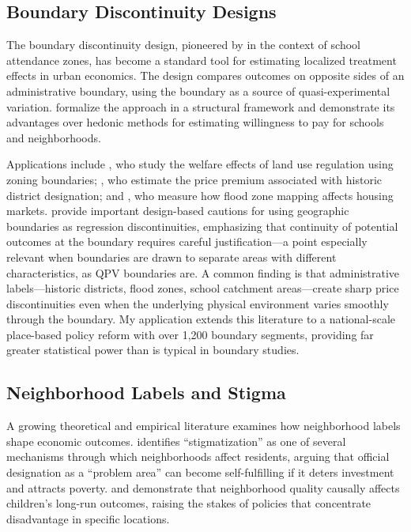 \documentclass[12pt]{article}
\begin{document}
\subsection{Boundary Discontinuity Designs}

The boundary discontinuity design, pioneered by \citet{black1999better} in the context of school attendance zones, has become a standard tool for estimating localized treatment effects in urban economics. The design compares outcomes on opposite sides of an administrative boundary, using the boundary as a source of quasi-experimental variation. \citet{bayer2007unified} formalize the approach in a structural framework and demonstrate its advantages over hedonic methods for estimating willingness to pay for schools and neighborhoods.

Applications include \citet{turner2014land}, who study the welfare effects of land use regulation using zoning boundaries; \citet{coulson2008historic}, who estimate the price premium associated with historic district designation; and \citet{gibson2019effects}, who measure how flood zone mapping affects housing markets. \citet{keele2015geographic} provide important design-based cautions for using geographic boundaries as regression discontinuities, emphasizing that continuity of potential outcomes at the boundary requires careful justification---a point especially relevant when boundaries are drawn to separate areas with different characteristics, as QPV boundaries are. A common finding is that administrative labels---historic districts, flood zones, school catchment areas---create sharp price discontinuities even when the underlying physical environment varies smoothly through the boundary. My application extends this literature to a national-scale place-based policy reform with over 1,200 boundary segments, providing far greater statistical power than is typical in boundary studies.

\subsection{Neighborhood Labels and Stigma}

A growing theoretical and empirical literature examines how neighborhood labels shape economic outcomes. \citet{galster2012mechanism} identifies ``stigmatization'' as one of several mechanisms through which neighborhoods affect residents, arguing that official designation as a ``problem area'' can become self-fulfilling if it deters investment and attracts poverty. \citet{chetty2016effects} and \citet{chyn2018moved} demonstrate that neighborhood quality causally affects children's long-run outcomes, raising the stakes of policies that concentrate disadvantage in specific locations.
\end{document}
